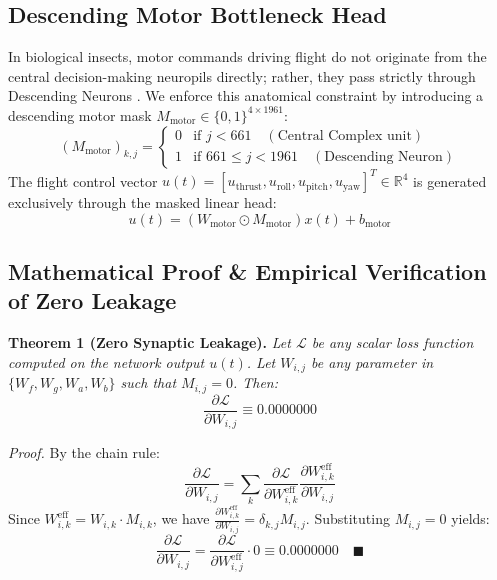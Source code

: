 \documentclass{article}
\begin{document}
\subsection{Descending Motor Bottleneck Head}
In biological insects, motor commands driving flight do not originate from the central decision-making neuropils directly; rather, they pass strictly through Descending Neurons \cite{namiki2018descending}. We enforce this anatomical constraint by introducing a descending motor mask $M_{\text{motor}} \in \{0, 1\}^{4 \times 1961}$:
\begin{equation}
(M_{\text{motor}})_{k, j} = \begin{cases}
0 & \text{if } j < 661 \quad (\text{Central Complex unit}) \\
1 & \text{if } 661 \le j < 1961 \quad (\text{Descending Neuron})
\end{cases}
\end{equation}
The flight control vector $u(t) = [u_{\text{thrust}}, u_{\text{roll}}, u_{\text{pitch}}, u_{\text{yaw}}]^T \in \mathbb{R}^4$ is generated exclusively through the masked linear head:
\begin{equation}
u(t) = (W_{\text{motor}} \odot M_{\text{motor}}) x(t) + b_{\text{motor}}
\end{equation}

\subsection{Mathematical Proof \& Empirical Verification of Zero Leakage}
\textbf{Theorem 1 (Zero Synaptic Leakage).} \emph{Let $\mathcal{L}$ be any scalar loss function computed on the network output $u(t)$. Let $W_{i, j}$ be any parameter in $\{W_f, W_g, W_a, W_b\}$ such that $M_{i, j} = 0$. Then:}
\begin{equation}
\frac{\partial \mathcal{L}}{\partial W_{i, j}} \equiv 0.0000000
\end{equation}

\emph{Proof.} By the chain rule:
\begin{equation}
\frac{\partial \mathcal{L}}{\partial W_{i, j}} = \sum_k \frac{\partial \mathcal{L}}{\partial W_{i, k}^{\text{eff}}} \frac{\partial W_{i, k}^{\text{eff}}}{\partial W_{i, j}}
\end{equation}
Since $W_{i, k}^{\text{eff}} = W_{i, k} \cdot M_{i, k}$, we have $\frac{\partial W_{i, k}^{\text{eff}}}{\partial W_{i, j}} = \delta_{k, j} M_{i, j}$. Substituting $M_{i, j} = 0$ yields:
\begin{equation}
\frac{\partial \mathcal{L}}{\partial W_{i, j}} = \frac{\partial \mathcal{L}}{\partial W_{i, j}^{\text{eff}}} \cdot 0 \equiv 0.0000000 \quad \blacksquare
\end{equation}
\end{document}
